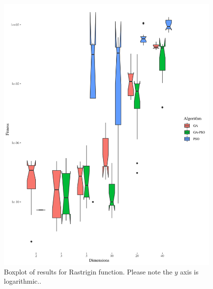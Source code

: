 \documentclass[runningheads]{llncs}
\begin{document}
    
            \begin{figure}[h!tb]
              \centering
                \includegraphics[height=0.5\textheight]{img/rastrigin-boxplot.png}
              \caption{Boxplot of results for Rastrigin function. Please note the $y$ axis is logarithmic..\label{fig:boxplot:rastrigin}}
            \end{figure}
%
\end{document}

